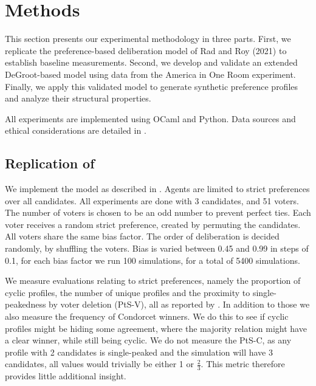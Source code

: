 \chapter{Methods}
\label{Methods}



This section presents our experimental methodology in three parts. First, we
replicate the preference-based deliberation model of Rad and Roy (2021) to
establish baseline measurements. Second, we develop and validate an extended
DeGroot-based model using data from the America in One Room experiment.
Finally, we apply this validated model to generate synthetic preference
profiles and analyze their structural properties.

All experiments are
implemented using OCaml and Python. Data sources and ethical considerations are
detailed in .


\section{Replication of \citet{radDeliberationSinglePeakednessCoherent2021}}

We implement the model as described in . Agents are
limited to strict preferences over all candidates. All experiments are done
with 3 candidates, and 51 voters. The number of voters is chosen to be an odd
number to prevent perfect ties. Each voter receives a random strict preference,
created by permuting the candidates. All voters share the same bias
factor. The order of deliberation is decided randomly, by shuffling the voters.
Bias is varied between 0.45 and 0.99 in steps of 0.1, for each bias factor we run 100 simulations, for a total of 5400 simulations.


We measure evaluations relating to strict preferences, namely the
proportion of cyclic profiles, the number of unique profiles and the proximity
to single-peakedness by voter deletion (PtS-V), all as reported by
\citet{radDeliberationSinglePeakednessCoherent2021}. In addition to those we
also measure the frequency of Condorcet winners. We do this to see if cyclic
profiles might be hiding some agreement, where the majority relation might have a clear winner, while still being cyclic. We do not measure the PtS-C, as any
profile with 2 candidates is single-peaked and the simulation will have 3
candidates, all values would trivially be either 1 or $\frac{2}{3}$.  This metric therefore
provides little additional insight.

